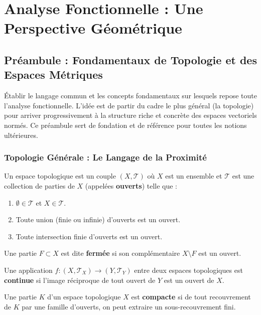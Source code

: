 \chapter{Analyse Fonctionnelle : Une Perspective Géométrique}

\section{Préambule : Fondamentaux de Topologie et des Espaces Métriques}

\begin{objectif}
    Établir le langage commun et les concepts fondamentaux sur lesquels repose toute l'analyse fonctionnelle. L'idée est de partir du cadre le plus général (la topologie) pour arriver progressivement à la structure riche et concrète des espaces vectoriels normés. Ce préambule sert de fondation et de référence pour toutes les notions ultérieures.
\end{objectif}

\subsection{Topologie Générale : Le Langage de la Proximité}

\begin{definition}
    Un espace topologique est un couple $(X, \mathcal{T})$ où $X$ est un ensemble et $\mathcal{T}$ est une collection de parties de $X$ (appelées \textbf{ouverts}) telle que :
    \begin{enumerate}
        \item $\emptyset \in \mathcal{T}$ et $X \in \mathcal{T}$.
        \item Toute union (finie ou infinie) d'ouverts est un ouvert.
        \item Toute intersection finie d'ouverts est un ouvert.
    \end{enumerate}
    Une partie $F \subset X$ est dite \textbf{fermée} si son complémentaire $X \setminus F$ est un ouvert.
\end{definition}

\begin{definition}[Continuité]
    Une application $f: (X, \mathcal{T}_X) \to (Y, \mathcal{T}_Y)$ entre deux espaces topologiques est \textbf{continue} si l'image réciproque de tout ouvert de $Y$ est un ouvert de $X$.
\end{definition}

\begin{definition}[Compacité]
    Une partie $K$ d'un espace topologique $X$ est \textbf{compacte} si de tout recouvrement de $K$ par une famille d'ouverts, on peut extraire un sous-recouvrement fini.
\end{definition}

